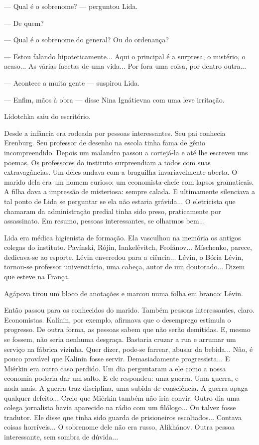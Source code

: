 --- Qual é o sobrenome? --- perguntou Lida.

--- De quem?

--- Qual é o sobrenome do general? Ou do ordenança?

--- Estou falando hipoteticamente... Aqui o principal é a surpresa, o
mistério, o acaso... As várias facetas de uma vida... Por fora uma
coisa, por dentro outra...

--- Acontece a muita gente --- suspirou Lida.

--- Enfim, mãos à obra --- disse Nina Ignátievna com uma leve irritação.

Lídotchka saiu do escritório.

Desde a infância era rodeada por pessoas interessantes. Seu pai conhecia
Erenburg. Seu professor de desenho na escola tinha fama de gênio
incompreendido. Depois um malandro passou a cortejá-la e até lhe
escreveu uns poemas. Os professores do instituto surpreendiam a todos
com suas extravagâncias. Um deles andava com a braguilha invariavelmente
aberta. O marido dela era um homem curioso: um economista-chefe com
lapsos gramaticais. A filha dava a impressão de misteriosa: sempre
calada. E ultimamente silenciava a tal ponto de Lida se perguntar se ela
não estaria grávida... O eletricista que chamaram da administração
predial tinha sido preso, praticamente por assassinato. Em resumo,
pessoas interessantes, se olharmos bem...

Lida era médica higienista de formação. Ela vasculhou na memória os
antigos colegas do instituto. Pavínski, Rójin, Iankelévitch, Feofánov...
Míschenko, parece, dedicava-se ao esporte. Lévin enveredou para a
ciência... Lévin, o Bória Lévin, tornou-se professor universitário, uma
cabeça, autor de um doutorado... Dizem que esteve na França.

Agápova tirou um bloco de anotações e marcou numa folha em branco:
Lévin.

Então passou para os conhecidos do marido. Também pessoas interessantes,
claro. Economistas. Kalínin, por exemplo, afirmava que o desemprego
estimula o progresso. De outra forma, as pessoas sabem que não serão
demitidas. E, mesmo se fossem, não seria nenhuma desgraça. Bastaria
cruzar a rua e arrumar um serviço na fábrica vizinha. Quer dizer,
pode-se farrear, abusar da bebida... Não, é pouco provável que Kalínin
fosse servir. Demasiadamente progressista... E Miérkin era outro caso
perdido. Um dia perguntaram a ele como a nossa economia poderia dar um
salto. E ele respondeu: uma guerra. Uma guerra, e nada mais. A guerra
traz disciplina, uma subida de consciência. A guerra apaga qualquer
defeito... Creio que Miérkin também não iria convir. Outro dia uma
colega jornalista havia aparecido na rádio com um filólogo... Ou talvez
fosse tradutor. Ele disse que tinha sido guarda de prisioneiros
escoltados... Contava coisas horríveis... O sobrenome dele não era
russo, Alikhánov. Outra pessoa interessante, sem sombra de dúvida...

